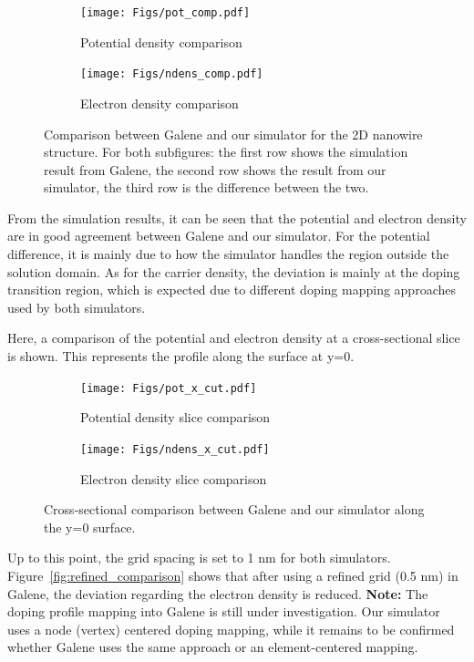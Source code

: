 \documentclass{article}
\begin{document}
\begin{figure}[H]
    \centering
    \begin{subfigure}[b]{0.48\textwidth}
        \centering
        \texttt{[image: Figs/pot\_comp.pdf]}
        \caption{Potential density comparison}
        \label{fig:potential_comp}
    \end{subfigure}
    \hfill
    \begin{subfigure}[b]{0.48\textwidth}
        \centering
        \texttt{[image: Figs/ndens\_comp.pdf]}
        \caption{Electron density comparison}
        \label{fig:ndens_comp}
    \end{subfigure}
    \caption{Comparison between Galene and our simulator for the 2D nanowire structure. For both subfigures: the first row shows the simulation result from Galene, the second row shows the result from our simulator, the third row is the difference between the two.}
    \label{fig:comparison}
\end{figure}

From the simulation results, it can be seen that the potential and electron density are in good agreement between Galene and our simulator. For the potential difference, it is mainly due to how the simulator handles the region outside the solution domain. As for the carrier density, the deviation is mainly at the doping transition region, which is expected due to different doping mapping approaches used by both simulators.

Here, a comparison of the potential and electron density at a cross-sectional slice is shown. This represents the profile along the surface at y=0.

\begin{figure}[H]
    \centering
    \begin{subfigure}[b]{0.48\textwidth}
        \centering
        \texttt{[image: Figs/pot\_x\_cut.pdf]}
        \caption{Potential density slice comparison}
        \label{fig:potential_slice}
    \end{subfigure}
    \hfill
    \begin{subfigure}[b]{0.48\textwidth}
        \centering
        \texttt{[image: Figs/ndens\_x\_cut.pdf]}
        \caption{Electron density slice comparison}
        \label{fig:ndens_slice}
    \end{subfigure}
    \caption{Cross-sectional comparison between Galene and our simulator along the y=0 surface.}
    \label{fig:slice_comparison}
\end{figure}


Up to this point, the grid spacing is set to 1 nm for both simulators. Figure~\ref{fig:refined_comparison} shows that after using a refined grid (0.5 nm) in Galene, the deviation regarding the electron density is reduced.
\textbf{Note:} The doping profile mapping into Galene is still under investigation. Our simulator uses a node (vertex) centered doping mapping, while it remains to be confirmed whether Galene uses the same approach or an element-centered mapping.
\end{document}
